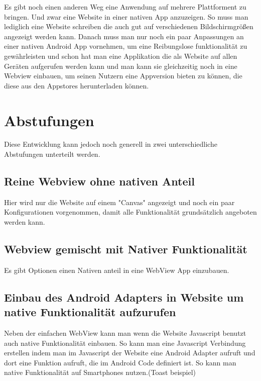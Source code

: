 Es gibt noch einen anderen Weg eine Anwendung auf mehrere Plattforment zu bringen.
Und zwar eine Website in einer nativen App anzuzeigen. So muss man lediglich eine Website schreiben die auch gut auf verschiedenen Bildschirmgrößen angezeigt werden kann. Danach muss man nur noch ein paar Anpassungen an einer nativen Android App vornehmen, um eine Reibungslose funktionalität zu gewährleisten und schon hat man eine Applikation die als Website auf allen Geräten aufgerufen werden kann und man kann sie gleichzeitig noch in eine Webview einbauen, um seinen Nutzern eine Appversion bieten zu können, die diese aus den Appstores herunterladen können.
\section{Abstufungen}
Diese Entwicklung kann jedoch noch generell in zwei unterschiedliche Abstufungen unterteilt werden. 
\subsection{Reine Webview ohne nativen Anteil}
Hier wird nur die Website auf einem "Canvas" angezeigt und noch ein paar Konfigurationen vorgenommen, damit alle Funktionalität grundsätzlich angeboten werden kann.

\subsection{Webview gemischt mit Nativer Funktionalität}
Es gibt Optionen einen Nativen anteil in eine WebView App einzubauen.
\subsection{Einbau des Android Adapters in Website um native Funktionalität aufzurufen}
Neben der einfachen WebView kann man wenn die Website Javascript benutzt auch native Funktionalität einbauen. So kann man eine Javascript Verbindung erstellen indem man im Javascript der Website eine Android Adapter aufruft und dort eine Funktion aufruft, die im Android Code definiert ist. So kann man native Funktionalität auf Smartphones nutzen.(Toast beispiel)
